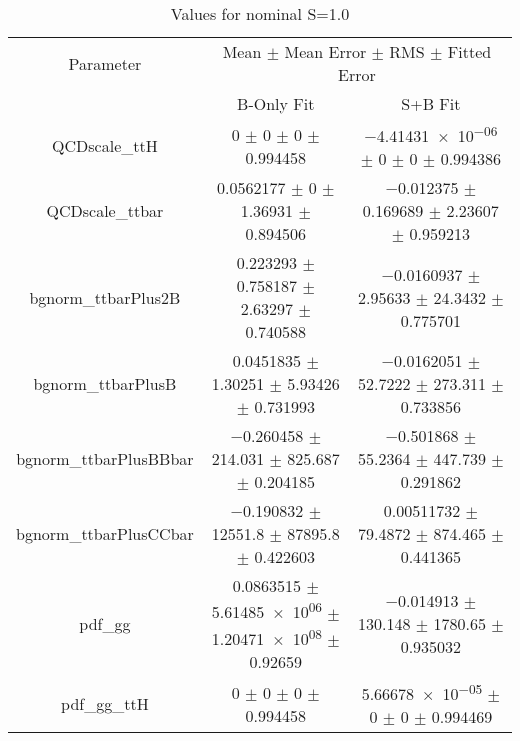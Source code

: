 \begin{table}
\centering
\caption{Values for nominal S=1.0}
\begin{tabular}{ccc}
\toprule
Parameter & \multicolumn{2}{c}{Mean $\pm$ Mean Error $\pm$ RMS $\pm$ Fitted Error}\\
 & B-Only Fit & S+B Fit\\
\midrule
QCDscale\_ttH & \num{0} $\pm$ \num{0} $\pm$ \num{0} $\pm$ \num{0.994458} & \num{-4.41431e-06} $\pm$ \num{0} $\pm$ \num{0} $\pm$ \num{0.994386}\\
QCDscale\_ttbar & \num{0.0562177} $\pm$ \num{0} $\pm$ \num{1.36931} $\pm$ \num{0.894506} & \num{-0.012375} $\pm$ \num{0.169689} $\pm$ \num{2.23607} $\pm$ \num{0.959213}\\
bgnorm\_ttbarPlus2B & \num{0.223293} $\pm$ \num{0.758187} $\pm$ \num{2.63297} $\pm$ \num{0.740588} & \num{-0.0160937} $\pm$ \num{2.95633} $\pm$ \num{24.3432} $\pm$ \num{0.775701}\\
bgnorm\_ttbarPlusB & \num{0.0451835} $\pm$ \num{1.30251} $\pm$ \num{5.93426} $\pm$ \num{0.731993} & \num{-0.0162051} $\pm$ \num{52.7222} $\pm$ \num{273.311} $\pm$ \num{0.733856}\\
bgnorm\_ttbarPlusBBbar & \num{-0.260458} $\pm$ \num{214.031} $\pm$ \num{825.687} $\pm$ \num{0.204185} & \num{-0.501868} $\pm$ \num{55.2364} $\pm$ \num{447.739} $\pm$ \num{0.291862}\\
bgnorm\_ttbarPlusCCbar & \num{-0.190832} $\pm$ \num{12551.8} $\pm$ \num{87895.8} $\pm$ \num{0.422603} & \num{0.00511732} $\pm$ \num{79.4872} $\pm$ \num{874.465} $\pm$ \num{0.441365}\\
pdf\_gg & \num{0.0863515} $\pm$ \num{5.61485e+06} $\pm$ \num{1.20471e+08} $\pm$ \num{0.92659} & \num{-0.014913} $\pm$ \num{130.148} $\pm$ \num{1780.65} $\pm$ \num{0.935032}\\
pdf\_gg\_ttH & \num{0} $\pm$ \num{0} $\pm$ \num{0} $\pm$ \num{0.994458} & \num{5.66678e-05} $\pm$ \num{0} $\pm$ \num{0} $\pm$ \num{0.994469}\\
\bottomrule
\end{tabular}
\end{table}